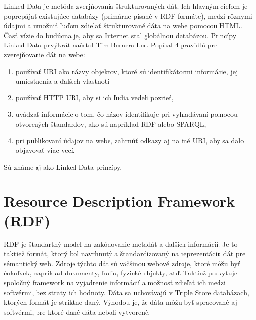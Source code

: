 \documentclass[12pt, a4paper, oneside]{book}
\begin{document}

Linked Data \cite{linkeddata} je metóda zverjňovania štrukturovaných dát. Ich hlavným cieľom je poprepájať existujúce databázy (primárne písané v RDF formáte), medzi rôznymi údajmi a umožniť ľuďom zdielať štrukturované dáta na webe pomocou HTML. Časť vízie do budúcna je, aby sa Internet stal globálnou databázou. Princípy Linked Data prvýkrát načrtol Tim Berners-Lee. Popísal 4 pravidlá pre zverejňovanie dát na webe:
\begin{enumerate}
  \item používať URI ako názvy objektov, ktoré sú identifikátormi informácie, jej umiestnenia a ďalších vlastnotí,
  \item používať HTTP URI, aby si ich ľudia vedeli pozrieť,
  \item uvádzať informácie o tom, čo názov identifikuje pri vyhľadávaní pomocou otvorených štandardov, ako sú napríklad RDF alebo SPARQL,
  \item pri publikovaní údajov na webe, zahrnúť odkazy aj na iné URI, aby sa dalo objavovať viac vecí.
\end{enumerate}
Sú známe aj ako Linked Data princípy.



\section{Resource Description Framework (RDF)}

RDF \cite{rdf} je štandartný model na zakódovanie metadát a ďalších informácií. Je to taktiež formát, ktorý bol navrhnutý a štandardizovaný na reprezentáciu dát pre sémantický web. Zdroje týchto dát sú väčšinou webové zdroje, ktoré môžu byť čokoľvek, napríklad dokumenty, ľudia, fyzické objekty, atď. Taktiež poskytuje spoločný framework na vyjadrenie informácií a možnosť zdieľať ich medzi softvérmi, bez straty ich hodnoty. Dáta sa uchovávajú v Triple Store databázach, ktorých formát je striktne daný. Výhodou je, že dáta môžu byť spracované aj softvérmi, pre ktoré dané dáta neboli vytvorené.
\end{document}
